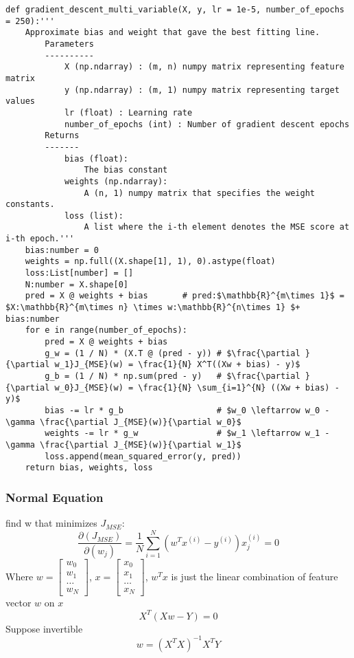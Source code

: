 \documentclass{article}
\begin{document}
\begin{lstlisting}[mathescape=true]
def gradient_descent_multi_variable(X, y, lr = 1e-5, number_of_epochs = 250):'''
    Approximate bias and weight that gave the best fitting line.
        Parameters
        ----------
            X (np.ndarray) : (m, n) numpy matrix representing feature matrix
            y (np.ndarray) : (m, 1) numpy matrix representing target values
            lr (float) : Learning rate
            number_of_epochs (int) : Number of gradient descent epochs
        Returns
        -------
            bias (float):
                The bias constant
            weights (np.ndarray):
                A (n, 1) numpy matrix that specifies the weight constants.
            loss (list):
                A list where the i-th element denotes the MSE score at i-th epoch.'''
    bias:number = 0
    weights = np.full((X.shape[1], 1), 0).astype(float)
    loss:List[number] = []
    N:number = X.shape[0]  
    pred = X @ weights + bias       # pred:$\mathbb{R}^{m\times 1}$ = $X:\mathbb{R}^{m\times n} \times w:\mathbb{R}^{n\times 1} $+ bias:number
    for e in range(number_of_epochs): 
        pred = X @ weights + bias
        g_w = (1 / N) * (X.T @ (pred - y)) # $\frac{\partial }{\partial w_1}J_{MSE}(w) = \frac{1}{N} X^T((Xw + bias) - y)$
        g_b = (1 / N) * np.sum(pred - y)   # $\frac{\partial }{\partial w_0}J_{MSE}(w) = \frac{1}{N} \sum_{i=1}^{N} ((Xw + bias) - y)$
        bias -= lr * g_b                   # $w_0 \leftarrow w_0 - \gamma \frac{\partial J_{MSE}(w)}{\partial w_0}$
        weights -= lr * g_w                # $w_1 \leftarrow w_1 - \gamma \frac{\partial J_{MSE}(w)}{\partial w_1}$
        loss.append(mean_squared_error(y, pred))
    return bias, weights, loss  
\end{lstlisting}


\subsubsection*{Normal Equation}
find w that minimizes $J_{MSE}$:
\[\frac{\partial(J_{MSE})}{\partial(w_j)} = \frac{1}{N} \sum_{i = 1}^{N} (w^Tx^{(i)} - y^{(i)})x_j^{(i)} = 0\]
Where \(w = 
\begin{bmatrix}
    w_0 \\w_1 \\\dots \\w_N
\end{bmatrix}\), $x = \begin{bmatrix}
    x_0 \\x_1 \\ \dots \\x_N 
\end{bmatrix}$, $w^Tx$ is just the linear combination of feature vector $w$ on $x$
\[X^T(Xw - Y) = 0\]
Suppose invertible
\[w = (X^TX)^{-1}X^TY\]
\end{document}

